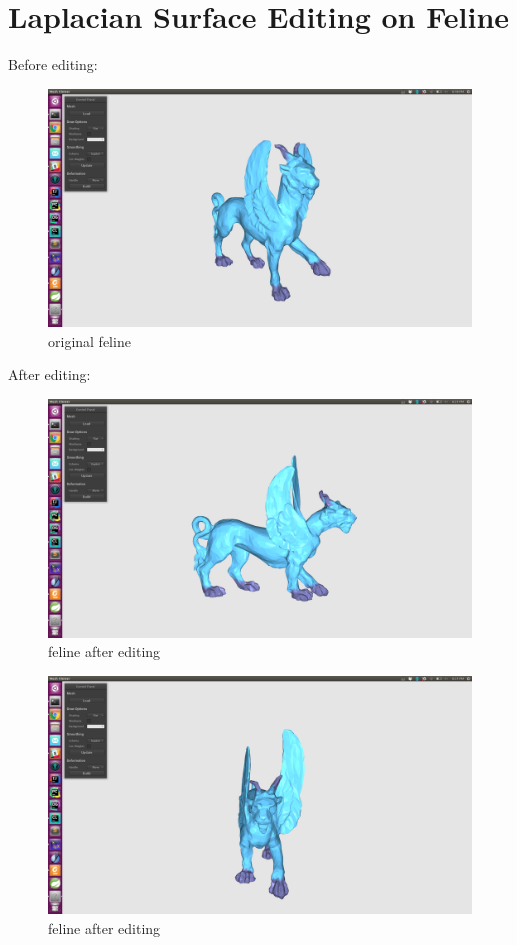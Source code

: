 \documentclass[twocolumn, a4paper]{article}
\begin{document}
\section{Laplacian Surface Editing on Feline}
Before editing:
\begin{figure}[H]
	\centering
	\includegraphics[width=1.0\linewidth]{feline_before.png}
	\caption{original feline}
\end{figure}
After editing:
\begin{figure}[H]
	\centering
	\includegraphics[width=1.0\linewidth]{feline_after1.png}
	\caption{feline after editing}
\end{figure}
\begin{figure}[H]
	\centering
	\includegraphics[width=1.0\linewidth]{feline_after2.png}
	\caption{feline after editing}
\end{figure}
\end{document}
